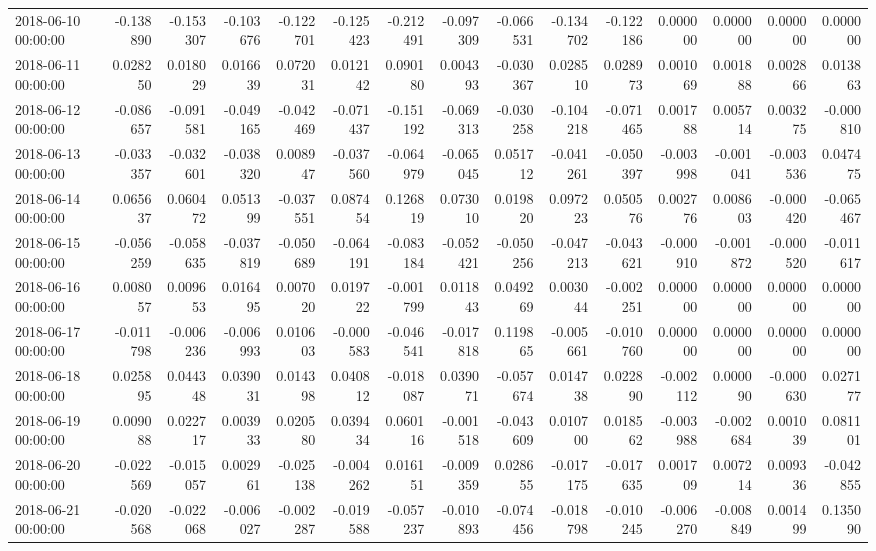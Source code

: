 \begin{tabular}{lrrrrrrrrrrrrrr}
2018-06-10 00:00:00 & -0.138890 & -0.153307 & -0.103676 & -0.122701 & -0.125423 & -0.212491 & -0.097309 & -0.066531 & -0.134702 & -0.122186 & 0.000000 & 0.000000 & 0.000000 & 0.000000 \\
2018-06-11 00:00:00 & 0.028250 & 0.018029 & 0.016639 & 0.072031 & 0.012142 & 0.090180 & 0.004393 & -0.030367 & 0.028510 & 0.028973 & 0.001069 & 0.001888 & 0.002866 & 0.013863 \\
2018-06-12 00:00:00 & -0.086657 & -0.091581 & -0.049165 & -0.042469 & -0.071437 & -0.151192 & -0.069313 & -0.030258 & -0.104218 & -0.071465 & 0.001788 & 0.005714 & 0.003275 & -0.000810 \\
2018-06-13 00:00:00 & -0.033357 & -0.032601 & -0.038320 & 0.008947 & -0.037560 & -0.064979 & -0.065045 & 0.051712 & -0.041261 & -0.050397 & -0.003998 & -0.001041 & -0.003536 & 0.047475 \\
2018-06-14 00:00:00 & 0.065637 & 0.060472 & 0.051399 & -0.037551 & 0.087454 & 0.126819 & 0.073010 & 0.019820 & 0.097223 & 0.050576 & 0.002776 & 0.008603 & -0.000420 & -0.065467 \\
2018-06-15 00:00:00 & -0.056259 & -0.058635 & -0.037819 & -0.050689 & -0.064191 & -0.083184 & -0.052421 & -0.050256 & -0.047213 & -0.043621 & -0.000910 & -0.001872 & -0.000520 & -0.011617 \\
2018-06-16 00:00:00 & 0.008057 & 0.009653 & 0.016495 & 0.007020 & 0.019722 & -0.001799 & 0.011843 & 0.049269 & 0.003044 & -0.002251 & 0.000000 & 0.000000 & 0.000000 & 0.000000 \\
2018-06-17 00:00:00 & -0.011798 & -0.006236 & -0.006993 & 0.010603 & -0.000583 & -0.046541 & -0.017818 & 0.119865 & -0.005661 & -0.010760 & 0.000000 & 0.000000 & 0.000000 & 0.000000 \\
2018-06-18 00:00:00 & 0.025895 & 0.044348 & 0.039031 & 0.014398 & 0.040812 & -0.018087 & 0.039071 & -0.057674 & 0.014738 & 0.022890 & -0.002112 & 0.000090 & -0.000630 & 0.027177 \\
2018-06-19 00:00:00 & 0.009088 & 0.022717 & 0.003933 & 0.020580 & 0.039434 & 0.060116 & -0.001518 & -0.043609 & 0.010700 & 0.018562 & -0.003988 & -0.002684 & 0.001039 & 0.081101 \\
2018-06-20 00:00:00 & -0.022569 & -0.015057 & 0.002961 & -0.025138 & -0.004262 & 0.016151 & -0.009359 & 0.028655 & -0.017175 & -0.017635 & 0.001709 & 0.007214 & 0.009336 & -0.042855 \\
2018-06-21 00:00:00 & -0.020568 & -0.022068 & -0.006027 & -0.002287 & -0.019588 & -0.057237 & -0.010893 & -0.074456 & -0.018798 & -0.010245 & -0.006270 & -0.008849 & 0.001499 & 0.135090 \\

\end{tabular}
